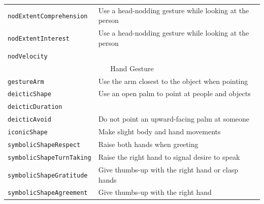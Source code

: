 \documentclass{CSSRforAfrica}
\begin{document}
\begin{table}[H]
\begin{center}
\begin{tabular}{|l l|}
{\footnotesize \verb+nodExtentComprehension+} 	           & {\footnotesize \verb++ Use a head-nodding gesture while looking at the  person}\vspace{-1.01mm} \\
{\footnotesize \verb+nodExtentInterest+} 	                           & {\footnotesize \verb++ Use a head-nodding gesture while looking at the  person} \vspace{-1.01mm} \\
{\footnotesize \verb+nodVelocity+} 	                                 & {\footnotesize \verb++} \\
\hline
\multicolumn{2}{|c|}{{\footnotesize Hand Gesture}} \vspace{-0mm}\\
\hline
{\footnotesize \verb+gestureArm+} 	                 & {\footnotesize \verb++  Use the arm closest to the object when pointing} \vspace{-1.01mm}\\
{\footnotesize \verb+deicticShape+} 	                 & {\footnotesize \verb++  Use an open palm to point at people and objects} \vspace{-1.01mm}\\
{\footnotesize \verb+deicticDuration+} 	                 & {\footnotesize \verb++} \vspace{-1.01mm}\\
{\footnotesize \verb+deicticAvoid+} 	                 & {\footnotesize \verb++ Do not point an upward-facing palm at someone} \vspace{-1.01mm}\\
{\footnotesize \verb+iconicShape+} 	                 & {\footnotesize \verb++ Make slight body and hand movements} \vspace{-1.01mm}\\
{\footnotesize \verb+symbolicShapeRespect+} 	                 & {\footnotesize \verb++ Raise both hands when greeting}\vspace{-1.01mm} \\
{\footnotesize \verb+symbolicShapeTurnTaking+} 	                 & {\footnotesize \verb++ Raise the right hand to signal desire to speak}\vspace{-1.01mm} \\
{\footnotesize \verb+symbolicShapeGratitude+} 	                 & {\footnotesize \verb++ Give thumbs-up with the right hand or clasp hands}\vspace{-1.01mm} \\
{\footnotesize \verb+symbolicShapeAgreement+}   & {\footnotesize \verb++ Give  thumbs-up with the right hand}\vspace{-1.01mm} \\

\end{tabular}
\end{center}
\end{table}
\end{document}
